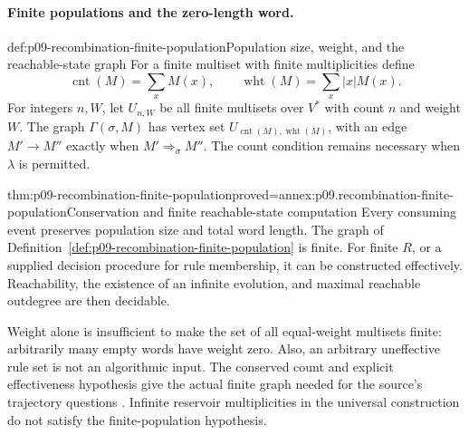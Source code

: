 \paragraph{Finite populations and the zero-length word.}

\begin{hbdefinition}{def:p09-recombination-finite-population}{Population size, weight, and the reachable-state graph}
For a finite multiset with finite multiplicities define
\[
 \operatorname{cnt}(M)=\sum_xM(x),\qquad
 \operatorname{wht}(M)=\sum_x|x|M(x).
\]
For integers \(n,W\), let \(U_{n,W}\) be all finite multisets over
\(V^*\) with count \(n\) and weight \(W\). The graph
\(\Gamma(\sigma,M)\) has vertex set
\(U_{\operatorname{cnt}(M),\operatorname{wht}(M)}\), with an edge
\(M'\to M''\) exactly when \(M'\Longrightarrow_\sigma M''\).
The count condition remains necessary when \(\lambda\) is permitted.
\end{hbdefinition}

\begin{hbtheorem}{thm:p09-recombination-finite-population}{proved=annex:p09.recombination-finite-population}{Conservation and finite reachable-state computation}
Every consuming event preserves population size and total word length.
The graph of Definition~\ref{def:p09-recombination-finite-population} is
finite. For finite \(R\), or a supplied decision procedure for rule
membership, it can be constructed effectively. Reachability, the existence
of an infinite evolution, and maximal reachable outdegree are then decidable.
\end{hbtheorem}

Weight alone is insufficient to make the set of all equal-weight multisets
finite: arbitrarily many empty words have weight zero. Also, an arbitrary
uneffective rule set is not an algorithmic input. The conserved count and
explicit effectiveness hypothesis give the actual finite graph needed for
the source's trajectory questions \cite[p.~323]{HeadPaunPixton1997RecombinationIntake}.
Infinite reservoir multiplicities in the universal construction do not
satisfy the finite-population hypothesis.
